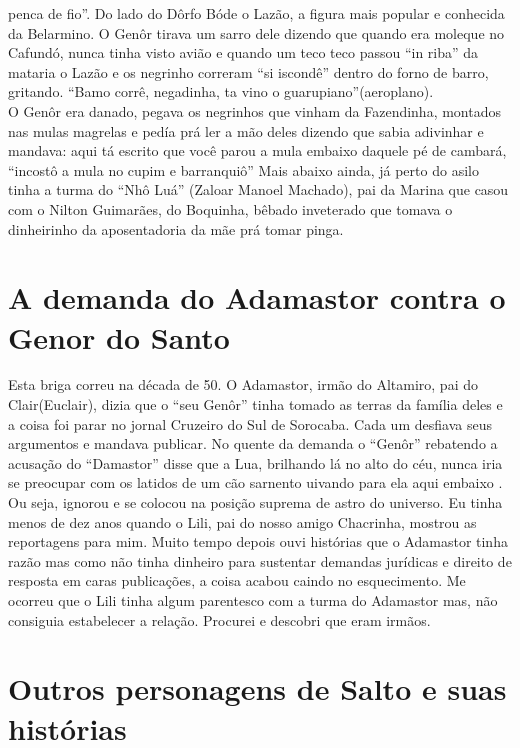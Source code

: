 \documentclass[12pt,brazil,]{book}
\begin{document}
penca de fio''. Do lado do Dôrfo Bóde o Lazão, a figura mais popular e
conhecida da Belarmino. O Genôr tirava um sarro dele dizendo que quando
era moleque no Cafundó, nunca tinha visto avião e quando um teco teco
passou ``in riba'' da mataria o Lazão e os negrinho correram ``si
iscondê'' dentro do forno de barro, gritando. ``Bamo corrê, negadinha,
ta vino o guarupiano''(aeroplano).\\
O Genôr era danado, pegava os negrinhos que vinham da Fazendinha,
montados nas mulas magrelas e pedía prá ler a mão deles dizendo que
sabia adivinhar e mandava: aqui tá escrito que você parou a mula embaixo
daquele pé de cambará, ``incostô a mula no cupim e barranquiô'' Mais
abaixo ainda, já perto do asilo tinha a turma do ``Nhô Luá'' (Zaloar
Manoel Machado), pai da Marina que casou com o Nilton Guimarães, do
Boquinha, bêbado inveterado que tomava o dinheirinho da aposentadoria da
mãe prá tomar pinga.

\section{A demanda do Adamastor contra o Genor do
Santo}\label{a-demanda-do-adamastor-contra-o-genor-do-santo}

Esta briga correu na década de 50. O Adamastor, irmão do Altamiro, pai
do Clair(Euclair), dizia que o ``seu Genôr'' tinha tomado as terras da
família deles e a coisa foi parar no jornal Cruzeiro do Sul de Sorocaba.
Cada um desfiava seus argumentos e mandava publicar. No quente da
demanda o ``Genôr'' rebatendo a acusação do ``Damastor'' disse que a
Lua, brilhando lá no alto do céu, nunca iria se preocupar com os latidos
de um cão sarnento uivando para ela aqui embaixo . Ou seja, ignorou e se
colocou na posição suprema de astro do universo. Eu tinha menos de dez
anos quando o Lili, pai do nosso amigo Chacrinha, mostrou as reportagens
para mim. Muito tempo depois ouvi histórias que o Adamastor tinha razão
mas como não tinha dinheiro para sustentar demandas jurídicas e direito
de resposta em caras publicações, a coisa acabou caindo no esquecimento.
Me ocorreu que o Lili tinha algum parentesco com a turma do Adamastor
mas, não consiguia estabelecer a relação. Procurei e descobri que eram
irmãos.

\section{Outros personagens de Salto e suas
histórias}\label{outros-personagens-de-salto-e-suas-histuxf3rias}
\end{document}
